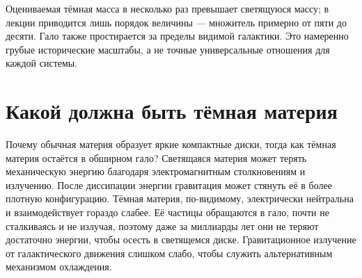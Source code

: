 Оцениваемая тёмная масса в несколько раз превышает светящуюся массу; в лекции приводится лишь порядок величины — множитель примерно от пяти до десяти. Гало также простирается за пределы видимой галактики. Это намеренно грубые исторические масштабы, а не точные универсальные отношения для каждой системы.

\section{Какой должна быть тёмная материя}

Почему обычная материя образует яркие компактные диски, тогда как тёмная материя остаётся в обширном гало? Светящаяся материя может терять механическую энергию благодаря электромагнитным столкновениям и излучению. После диссипации энергии гравитация может стянуть её в более плотную конфигурацию. Тёмная материя, по-видимому, электрически нейтральна и взаимодействует гораздо слабее. Её частицы обращаются в гало, почти не сталкиваясь и не излучая, поэтому даже за миллиарды лет они не теряют достаточно энергии, чтобы осесть в светящемся диске. Гравитационное излучение от галактического движения слишком слабо, чтобы служить альтернативным механизмом охлаждения.

\begin{classroomqa}
\end{classroomqa}

\begin{classroomqa}
\end{classroomqa}

